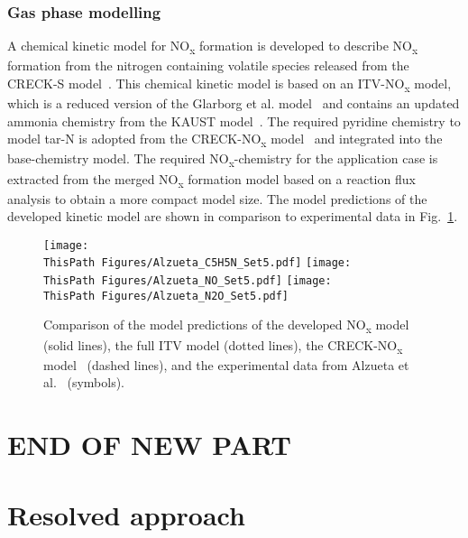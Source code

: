 \begin{btUnit}
\subsubsection{Gas phase modelling}
A chemical kinetic model for NO\textsubscript{x} formation is developed to describe NO\textsubscript{x} formation from the nitrogen containing volatile species released from the CRECK-S model~\cite{Ranzi2008, Debiagi2015}. This chemical kinetic model is based on an ITV-NO\textsubscript{x} model, which is a reduced version of the Glarborg et al. model~\cite{Glarborg2018} and contains an updated ammonia chemistry from the KAUST model~\cite{Zhang2021}. The required pyridine chemistry to model tar-N is adopted from the CRECK-NO\textsubscript{x} model~\cite{Shamooni2021} and integrated into the base-chemistry model. The required NO\textsubscript{x}-chemistry for the application case is extracted from the merged NO\textsubscript{x} formation model based on a reaction flux analysis to obtain a more compact model size. The model predictions of the developed kinetic model are shown in comparison to experimental data in Fig.~\ref{fig:B3NOxMechValidation}.
\begin{figure}[h]
    \texttt{[image: \\ThisPath Figures/Alzueta\_C5H5N\_Set5.pdf]}
    \texttt{[image: \\ThisPath Figures/Alzueta\_NO\_Set5.pdf]}
    \texttt{[image: \\ThisPath Figures/Alzueta\_N2O\_Set5.pdf]}
    \caption{Comparison of the model predictions of the developed NO\textsubscript{x} model (solid lines), the full ITV model (dotted lines), the CRECK-NO\textsubscript{x} model~\cite{Shamooni2021} (dashed lines), and the experimental data from Alzueta et al.~\cite{Alzueta2002} (symbols).}\label{fig:B3NOxMechValidation}
\end{figure}




\newpage
\section{END OF NEW PART}
\clearpage
\section{Resolved approach}

\end{btUnit}
